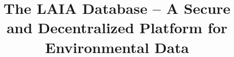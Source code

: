 \documentclass[conference,final,]{IEEEtran}
\begin{document}
%
\title{The LAIA Database -- A Secure and Decentralized Platform for
Environmental Data}


\author{










}


%
\end{document}
